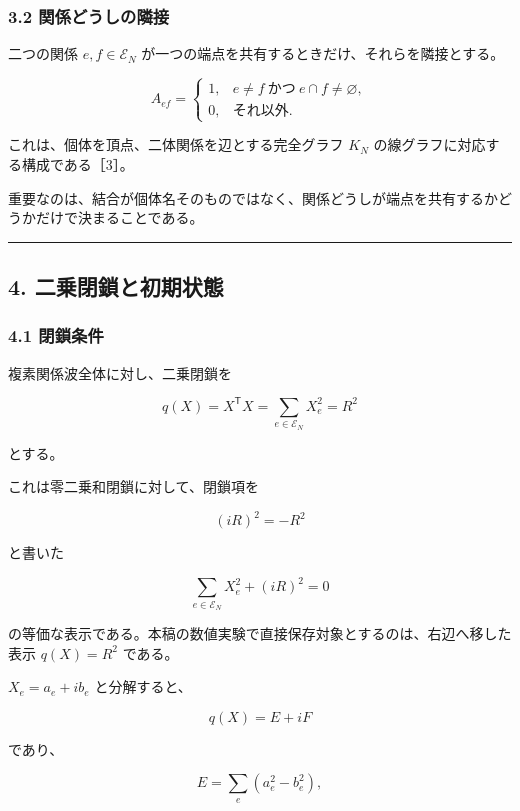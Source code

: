 \documentclass[
  10pt,
  a4paper,
]{article}
\begin{document}
\subsubsection{3.2
関係どうしの隣接}\label{ux95a2ux4fc2ux3069ux3046ux3057ux306eux96a3ux63a5}

二つの関係 \(e,f\in\mathcal E_N\)
が一つの端点を共有するときだけ、それらを隣接とする。

\[
A_{ef}
=
\begin{cases}
1,
& e\ne f\ \text{かつ}\ e\cap f\ne\varnothing,\\
0,
& \text{それ以外}.
\end{cases}
\]

これは、個体を頂点、二体関係を辺とする完全グラフ \(K_N\)
の線グラフに対応する構成である［3］。

重要なのは、結合が個体名そのものではなく、関係どうしが端点を共有するかどうかだけで決まることである。

\begin{center}\rule{0.5\linewidth}{0.5pt}\end{center}

\subsection{4.
二乗閉鎖と初期状態}\label{ux4e8cux4e57ux9589ux9396ux3068ux521dux671fux72b6ux614b}

\subsubsection{4.1 閉鎖条件}\label{ux9589ux9396ux6761ux4ef6}

複素関係波全体に対し、二乗閉鎖を

\[
q(X)
=
X^{\mathsf T}X
=
\sum_{e\in\mathcal E_N}X_e^2
=
R^2
\]

とする。

これは零二乗和閉鎖に対して、閉鎖項を

\[
(iR)^2=-R^2
\]

と書いた

\[
\sum_{e\in\mathcal E_N}X_e^2+(iR)^2=0
\]

の等価な表示である。本稿の数値実験で直接保存対象とするのは、右辺へ移した表示
\(q(X)=R^2\) である。

\(X_e=a_e+i b_e\) と分解すると、

\[
q(X)=E+iF
\]

であり、

\[
E
=
\sum_e\left(a_e^2-b_e^2\right),
\]
\end{document}
